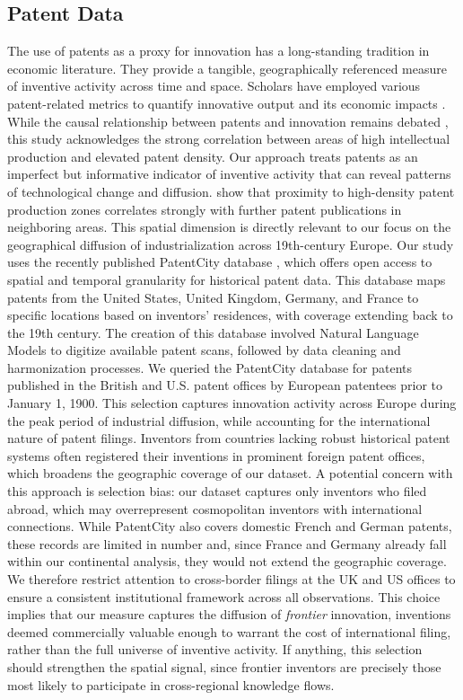 \documentclass[letterpaper,12pt,leqno]{article}
\begin{document}
\subsection{Patent Data}
The use of patents as a proxy for innovation has a long-standing tradition in economic literature. They provide a tangible, geographically referenced measure of inventive activity across time and space. Scholars have employed various patent-related metrics to quantify innovative output and its economic impacts \citep{aghion2013innovation}. While the causal relationship between patents and innovation remains debated \citep{boldrin2008against}, this study acknowledges the strong correlation between areas of high intellectual production and elevated patent density. Our approach treats patents as an imperfect but informative indicator of inventive activity that can reveal patterns of technological change and diffusion.
\citet{buzard2020localized} show that proximity to high-density patent production zones correlates strongly with further patent publications in neighboring areas. This spatial dimension is directly relevant to our focus on the geographical diffusion of industrialization across 19th-century Europe.
Our study uses the recently published PatentCity database \citep{bergeaud2024new}, which offers open access to spatial and temporal granularity for historical patent data. This database maps patents from the United States, United Kingdom, Germany, and France to specific locations based on inventors' residences, with coverage extending back to the 19th century. The creation of this database involved Natural Language Models to digitize available patent scans, followed by data cleaning and harmonization processes.
We queried the PatentCity database for patents published in the British and U.S. patent offices by European patentees prior to January 1, 1900. This selection captures innovation activity across Europe during the peak period of industrial diffusion, while accounting for the international nature of patent filings. Inventors from countries lacking robust historical patent systems often registered their inventions in prominent foreign patent offices, which broadens the geographic coverage of our dataset.
A potential concern with this approach is selection bias: our dataset captures only inventors who filed abroad, which may overrepresent cosmopolitan inventors with international connections. While PatentCity also covers domestic French and German patents, these records are limited in number and, since France and Germany already fall within our continental analysis, they would not extend the geographic coverage. We therefore restrict attention to cross-border filings at the UK and US offices to ensure a consistent institutional framework across all observations. This choice implies that our measure captures the diffusion of \textit{frontier} innovation, inventions deemed commercially valuable enough to warrant the cost of international filing, rather than the full universe of inventive activity. If anything, this selection should strengthen the spatial signal, since frontier inventors are precisely those most likely to participate in cross-regional knowledge flows.
\end{document}
